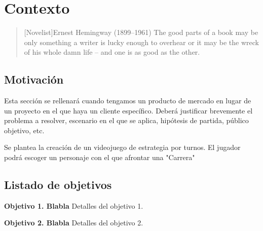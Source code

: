 \chapter{Contexto}

\begin{quotation}[Novelist]{Ernest Hemingway (1899--1961)}
The good parts of a book may be only something a writer is lucky enough to overhear or it may be the wreck of his whole damn life -- and one is as good as the other.
\end{quotation}

\begin{abstract}
Aqu\'i mal un breve resumen del capítulo.
\end{abstract}

\section{Motivación}
Esta sección se rellenará cuando tengamos un producto de mercado en lugar de un proyecto en el que haya un cliente específico. Deberá justificar brevemente el problema a resolver, escenario en el que se aplica, hipótesis de partida, público objetivo, etc.

Se plantea la creación de un videojuego de estrategia por turnos. El jugador podrá escoger un personaje con el que afrontar una "Carrera"

\section{Listado de objetivos}

\begin{description}
\item \textbf{Objetivo 1. Blabla} Detalles del objetivo 1.
\item \textbf{Objetivo 2. Blabla} Detalles del objetivo 2.
\end{description}
